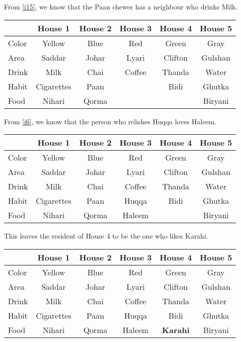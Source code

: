 \documentclass[a4paper]{exam}
\newcommand\cb{\color{blue}}
\begin{document}
\begin{questions}
\begin{solution}
     From \ref{i15}, we know that the Paan chewer has a neighbour who drinks Milk. \\
    \begin{tabular}{l||*5{c|}}
      & \textbf{House 1} & \textbf{\cb House 2} & \textbf{House 3} & \textbf{House 4} & \textbf{House 5} \\
      \hline\hline
      Color & Yellow & Blue & Red& Green & Gray\\\hline
      Area & Saddar & Johar& Lyari & Clifton & Gulshan\\\hline
      Drink &Milk & Chai&Coffee & Thanda & Water\\\hline
      Habit & Cigarettes&  Paan & &Bidi & Ghutka\\\hline
      Food &Nihari & Qorma & & & Biryani\\\hline
      \end{tabular}

    From \ref{i6}, we know that the person who relishes Huqqa loves Haleem. \\
    \begin{tabular}{l||*5{c|}}
      & \textbf{House 1} & \textbf{\cb House 2} & \textbf{House 3} & \textbf{House 4} & \textbf{House 5} \\
      \hline\hline
      Color & Yellow & Blue & Red& Green & Gray\\\hline
      Area & Saddar & Johar& Lyari & Clifton & Gulshan\\\hline
      Drink &Milk & Chai&Coffee & Thanda & Water\\\hline
      Habit & Cigarettes&  Paan &Huqqa &Bidi & Ghutka\\\hline
      Food &Nihari & Qorma & Haleem & & Biryani\\\hline
      \end{tabular}

      This leaves the resident of House 4 to be the one who likes Karahi.\\
      
    
    \begin{tabular}{l||*5{c|}}
      & \textbf{House 1} & \textbf{\cb House 2} & \textbf{House 3} & \textbf{House 4} & \textbf{House 5} \\
      \hline\hline
      Color & Yellow & Blue & Red& Green & Gray\\\hline
      Area & Saddar & Johar& Lyari & Clifton & Gulshan\\\hline
      Drink &Milk & Chai&Coffee & Thanda & Water\\\hline
      Habit & Cigarettes&  Paan &Huqqa &Bidi & Ghutka\\\hline
      Food &Nihari & Qorma & Haleem & \textbf{Karahi} & Biryani\\\hline
      \end{tabular}



    
  \end{solution}
  
\end{questions}
\end{document}
